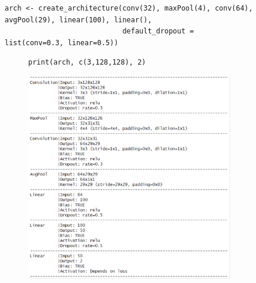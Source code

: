 \documentclass[12pt,twoside]{scrreport}
\begin{document}
\begin{figure}[t]
	\centering
	\newsavebox{\archbox} %
	\begin{lrbox}{\archbox}
		\begin{lstlisting}
arch <- create_architecture(conv(32), maxPool(4), conv(64), avgPool(29), linear(100), linear(),
                            default_dropout = list(conv=0.3, linear=0.5))
		\end{lstlisting}
	\end{lrbox}
	\resizebox{\textwidth}{!}{\fbox{\usebox{\archbox}}}
	\begin{subfigure}{0.47\textwidth}
		\centering
		\vspace*{0.2cm}
		\newsavebox{\printbox} %
		\begin{lrbox}{\printbox}
			\begin{lstlisting}[basicstyle=\footnotesize]
print(arch, c(3,128,128), 2)
			\end{lstlisting}
		\end{lrbox}
		\fbox{\usebox{\printbox}}
		\newline
		\vspace*{0.04cm}
		\includegraphics[width=\textwidth]{print.pdf}
	\end{subfigure}
	\hfill
	\begin{subfigure}{0.47\textwidth}

\end{subfigure}
\end{figure}
\end{document}
